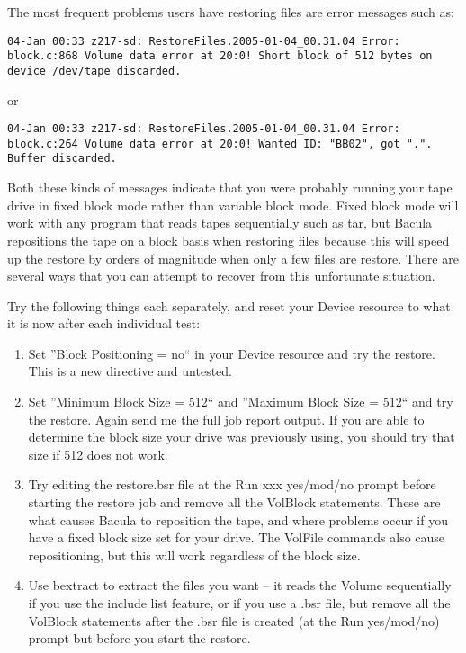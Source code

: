 The most frequent problems users have restoring files are error messages such
as: 

\footnotesize
\begin{verbatim}
04-Jan 00:33 z217-sd: RestoreFiles.2005-01-04_00.31.04 Error:
block.c:868 Volume data error at 20:0! Short block of 512 bytes on
device /dev/tape discarded.
\end{verbatim}
\normalsize

or 

\footnotesize
\begin{verbatim}
04-Jan 00:33 z217-sd: RestoreFiles.2005-01-04_00.31.04 Error:
block.c:264 Volume data error at 20:0! Wanted ID: "BB02", got ".".
Buffer discarded.
\end{verbatim}
\normalsize

Both these kinds of messages indicate that you were probably running your tape
drive in fixed block mode rather than variable block mode. Fixed block mode
will work with any program that reads tapes sequentially such as tar, but
Bacula repositions the tape on a block basis when restoring files because this
will speed up the restore by orders of magnitude when only a few files are
restore. There are several ways that you can attempt to recover from this
unfortunate situation. 

Try the following things each separately, and reset your Device resource to
what it is now after each individual test: 

\begin{enumerate}
\item Set ''Block Positioning = no`` in your Device resource  and try the
   restore. This is a new directive and untested. 
\item Set ''Minimum Block Size = 512`` and ''Maximum  Block Size = 512`` and
   try the restore. Again send me the  full job report output. If you are able to
   determine the  block size your drive was previously using, you should try 
that size if 512 does not work. 
\item Try editing the restore.bsr file at the Run xxx yes/mod/no prompt 
   before starting the restore job and remove all the VolBlock  statements. These
   are what causes Bacula to reposition the tape,  and where problems occur if
you have a fixed block size set  for your drive. The VolFile commands also
cause repositioning,  but this will work regardless of the block size. 
\item Use bextract to extract the files you want -- it reads the  Volume
   sequentially if you use the include list feature, or  if you use a .bsr file,
   but remove all the VolBlock statements  after the .bsr file is created (at the
Run yes/mod/no) prompt but  before you start the restore. 
\end{enumerate}

